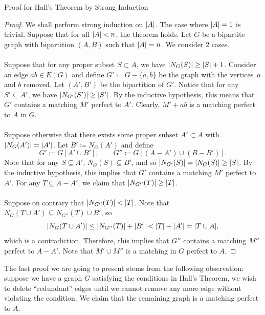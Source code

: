 \documentclass[math]{amznotes}
\theoremstyle{remark}
\newcommand{\0}{\mathbf{0}}
\newcommand{\1}{\mathbf{1}}
\begin{document}
\begin{genbox}{Proof for Hall's Theorem by Strong Induction}
    \begin{proof}
        We shall perform strong induction on ${\left\lvert {A} \right\rvert}$. The case where ${\left\lvert {A} \right\rvert} = 1$ is trivial. Suppose that for all ${\left\lvert {A} \right\rvert} < n$, the theorem holds. Let $G$ be a bipartite graph with bipartition $(A, B)$ such that ${\left\lvert {A} \right\rvert} = n$. We consider $2$ cases.
        \\\\
        Suppose that for any proper subset $S \subset A$, we have ${\left\lvert {N_G(S)} \right\rvert} \geq {\left\lvert {S} \right\rvert} + 1$. Consider an edge $ab \in E(G)$ and define $G' \coloneqq G - \{a, b\}$ be the graph with the vertices~$a$ and $b$ removed. Let $(A', B')$ be the bipartition of $G'$. Notice that for any $S' \subseteq A'$, we have ${\left\lvert {N_{G'}(S')} \right\rvert} \geq {\left\lvert {S'} \right\rvert}$. By the inductive hypothesis, this means that $G'$ contains a matching $M'$ perfect to $A'$. Clearly, $M' + ab$ is a matching perfect to $A$ in $G$.
        \\\\
        Suppose otherwise that there exists some proper subset $A' \subset A$ with ${\left\lvert {N_G(A')} \right\rvert} = {\left\lvert {A'} \right\rvert}$. Let $B' \coloneqq N_G(A')$ and define
        \begin{equation*}
            G' \coloneqq G[A' \cup B'], \qquad G'' \coloneqq G[(A - A') \cup (B - B')].
        \end{equation*}
        Note that for any $S \subseteq A'$, $N_{G}(S) \subseteq B'$, and so ${\left\lvert {N_{G'}(S)} \right\rvert} = {\left\lvert {N_G(S)} \right\rvert} \geq {\left\lvert {S} \right\rvert}$. By the inductive hypothesis, this implies that $G'$ contains a matching $M'$ perfect to $A'$. For any $T \subseteq A - A'$, we claim that ${\left\lvert {N_{G''}(T)} \right\rvert} \geq {\left\lvert {T} \right\rvert}$.
        \\\\
        Suppose on contrary that ${\left\lvert {N_{G''}(T)} \right\rvert} < {\left\lvert {T} \right\rvert}$. Note that $N_G(T \cup A') \subseteq N_{G''}(T) \cup B'$, so
        \begin{equation*}
            {\left\lvert {N_G(T \cup A')} \right\rvert} \leq {\left\lvert {N_{G''}(T)} \right\rvert} + {\left\lvert {B'} \right\rvert} < {\left\lvert {T} \right\rvert} + {\left\lvert {A'} \right\rvert} = {\left\lvert {T \cup A} \right\rvert},
        \end{equation*}
        which is a contradiction. Therefore, this implies that $G''$ contains a matching $M''$ perfect to $A - A'$. Note that $M' \cup M''$ is a matching in $G$ perfect to $A$.
    \end{proof}
\end{genbox}
The last proof we are going to present stems from the following observation: suppose we have a graph $G$ satisfying the conditions in Hall's Theorem, we wish to delete ``redundant'' edges until we cannot remove any more edge without violating the condition. We claim that the remaining graph is a matching perfect to $A$.
\end{document}

